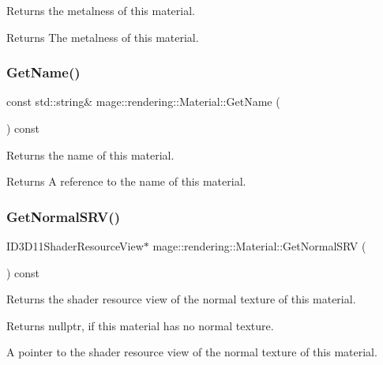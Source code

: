 Returns the metalness of this material.

\begin{DoxyReturn}{Returns}
The metalness of this material. 
\end{DoxyReturn}
\mbox{\label{classmage_1_1rendering_1_1_material_a7ba9bfe03829a11de89198b0e343630d}} 
\subsubsection{\texorpdfstring{Get\+Name()}{GetName()}}
{\footnotesize\ttfamily const std\+::string\& mage\+::rendering\+::\+Material\+::\+Get\+Name (\begin{DoxyParamCaption}{ }\end{DoxyParamCaption}) const\hspace{0.3cm}{\ttfamily [noexcept]}}

Returns the name of this material.

\begin{DoxyReturn}{Returns}
A reference to the name of this material. 
\end{DoxyReturn}
\mbox{\label{classmage_1_1rendering_1_1_material_a8617392cee8e8609671be3f4147a5934}} 
\subsubsection{\texorpdfstring{Get\+Normal\+S\+R\+V()}{GetNormalSRV()}}
{\footnotesize\ttfamily I\+D3\+D11\+Shader\+Resource\+View$\ast$ mage\+::rendering\+::\+Material\+::\+Get\+Normal\+S\+RV (\begin{DoxyParamCaption}{ }\end{DoxyParamCaption}) const\hspace{0.3cm}{\ttfamily [noexcept]}}

Returns the shader resource view of the normal texture of this material.

\begin{DoxyReturn}{Returns}
{\ttfamily nullptr}, if this material has no normal texture. 

A pointer to the shader resource view of the normal texture of this material. 
\end{DoxyReturn}
\mbox{\label{classmage_1_1rendering_1_1_material_a1ae7786ebd627d3e7ecaf2dc671f497d}} 
